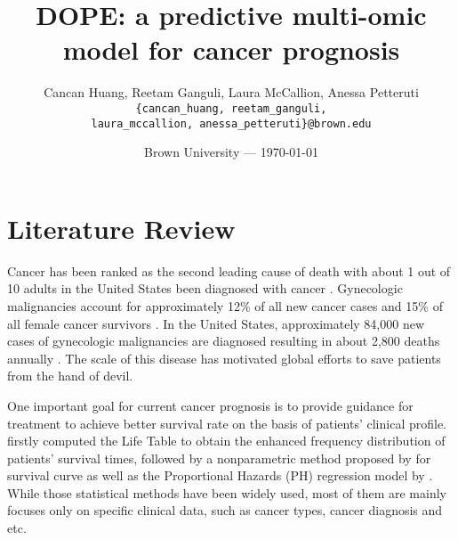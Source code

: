 \documentclass{article}
\title{DOPE: a predictive multi-omic model for cancer prognosis} %
\author{Cancan Huang, Reetam Ganguli, Laura McCallion, Anessa Petteruti\\ \texttt{\{cancan\_huang, reetam\_ganguli,} \\ \texttt{laura\_mccallion, anessa\_petteruti\}@brown.edu}} %
\date{Brown University --- \today} %
\begin{document}
\maketitle %

\vspace{-1cm}
\section*{Literature Review} %

Cancer has been ranked as the second leading cause of death with about 1 out of 10 adults in the United States been diagnosed with cancer \citep{aruleba2020applications,siegel2019cancer}. Gynecologic malignancies account for approximately 12\% of all new cancer cases and 15\% of all female cancer survivors \citep{salani2017update}. In the United States, approximately 84,000 new cases of gynecologic malignancies are diagnosed resulting in about 2,800 deaths annually \citep{stewart2013gynecologic}. The scale of this disease has motivated global efforts to save patients from the hand of devil.



One important goal for current cancer prognosis is to provide guidance for treatment to achieve better survival rate on the basis of patients' clinical profile.
\citealp{rp1950calculation} firstly computed the Life Table to obtain the enhanced frequency distribution of patients' survival times, followed by a nonparametric method proposed by \citealp{kaplan1958nonparametric} for survival curve as well as the Proportional Hazards (PH) regression model by \citealp{cox1972regression}. While those statistical methods have been widely used, most of them are mainly focuses only on specific clinical data, such as cancer types, cancer diagnosis and etc.
\end{document}
